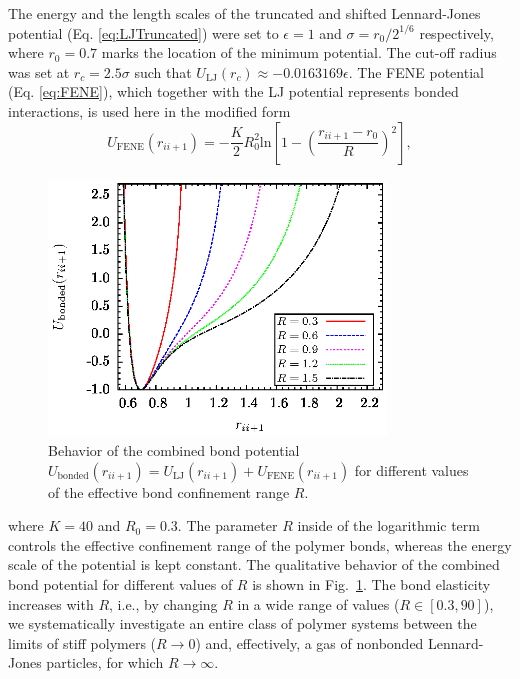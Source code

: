\documentclass[12pt]{report}
\begin{document}
The energy and the length scales of the truncated and shifted Lennard-Jones potential (Eq.\,\,\ref{eq:LJTruncated}) were set to 
$\epsilon=1$ and $\sigma=r_0/2^{1/6}$ respectively, where $r_0 = 0.7$ marks the location of the minimum potential. The cut-off radius was set at $r_c=2.5\sigma$ such that $U_{\mathrm{LJ}}(r_{c}) \approx -0.0163169\epsilon$. The FENE potential (Eq.\,\,\ref{eq:FENE}), which together with the LJ potential represents bonded interactions, is used here in the modified form
%
\begin{equation}
\label{eq:ModFENE}
U_{\mathrm{FENE}}(r_{ii+1})=-\frac{K}{2}R_{0}^2 
\mathrm{ln}\left[1-\left(\frac{r_{ii+1}-r_0}{R}\right)^2\right], 
\end{equation}
%
%
\begin{figure}
\center
\includegraphics[width = 0.8\textwidth]{chapter5Figs/bond_potential.eps}
\caption{\label{fig:ModifiedBondedPotential}%
Behavior of the combined bond potential $U_{\mathrm{bonded}}(r_{ii+1}) = U_{\mathrm{LJ}}(r_{ii+1}) + U_{\mathrm{FENE}}(r_{ii+1})$ for different values of the effective bond confinement range $R$.}
\end{figure} 
%
where $K=40$ and $R_{0}=0.3$. The parameter $R$ inside of the logarithmic term controls the effective confinement range of the polymer bonds, whereas the energy scale of the potential is kept constant. The qualitative behavior of the combined bond potential for different values of $R$ is shown in Fig.~\ref{fig:ModifiedBondedPotential}. The bond elasticity increases with $R$, i.e., by changing $R$ in a wide range of values ($R\in[0.3,90]$), we systematically investigate an entire class of polymer systems between the limits of stiff polymers ($R\to 0$) and, effectively, a gas of nonbonded Lennard-Jones particles, for which $R\to \infty$.  
\end{document}
